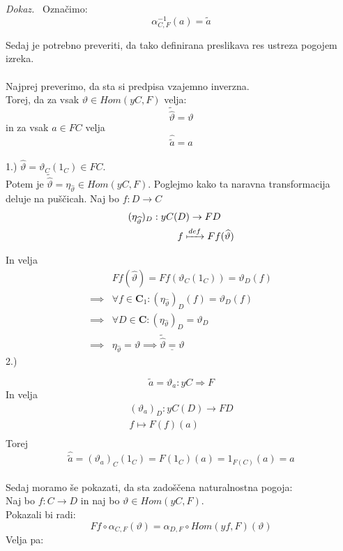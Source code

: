 \documentclass[12pt,a4paper]{book}
\theoremstyle{definition}
\theoremstyle{plain}
\newenvironment{dokaz}{\emph{Dokaz.}\ }{\hspace{\fill}{$\Box$}}
\theoremstyle{definition}
\theoremstyle{remark}
\begin{document}
\begin{dokaz}
Označimo:
\begin{equation}
\boxed{\alpha^{-1}_{C,F}(a) = \widetilde{a}}
\end{equation}

Sedaj je potrebno preveriti, da tako definirana preslikava res ustreza pogojem izreka. \\
\\
Najprej preverimo, da sta si predpisa vzajemno inverzna. \\
Torej, da za vsak $\vartheta \in Hom(yC,F)$ velja: 
$$\widetilde{\widehat{\vartheta}} = \vartheta$$
in za vsak $a \in FC$ velja
$$\widehat{\widetilde{a}} = a$$
\\ 1.)
$\widehat{\vartheta} = \vartheta_C(1_C) \in FC$. \\
Potem je $\widetilde{\widehat{\vartheta}} = \eta_{\widehat{\vartheta}} \in Hom(yC,F)$. Poglejmo kako ta naravna transformacija deluje na puščicah. Naj bo $f : D \to C$
\begin{align*}
(\eta_{\widehat{\vartheta}})_D : yC(&D) \to FD \\
&f \xmapsto{def} Ff(\widehat{\vartheta}) \\
\end{align*}

In velja
\begin{align*}
&Ff(\widehat{\vartheta}) = Ff(\vartheta_C(1_C)) = \vartheta_D(f) \\
\implies& \forall f \in \textbf{C}_1  : (\eta_{\widehat{\vartheta}})_D(f) = \vartheta_D(f) \\
\implies& \forall D \in \textbf{C} : (\eta_{\widehat{\vartheta}})_D = \vartheta_D \\
\implies& \eta_{\widehat{\vartheta}} = \vartheta
\implies \underline{\widetilde{\widehat{\vartheta}} = \vartheta}
\end{align*}
2.) 

$$\widetilde{a} = \vartheta_a : yC \Rightarrow F$$
In velja
\begin{align*}
(\vartheta_a)_D : yC(D) \to FD \\
f \mapsto F(f)(a) \\
\end{align*}
Torej
$$\widehat{\widetilde{a}} = (\vartheta_a)_C(1_C) = F(1_C)(a) = 1_{F(C)}(a) = a$$
\\
Sedaj moramo še pokazati, da sta zadoščena naturalnostna pogoja: \\
Naj bo $f : C \to D$ in naj bo $\vartheta \in Hom(yC,F)$. \\
Pokazali bi radi:
\begin{equation}
Ff \circ \alpha_{C,F}(\vartheta) = \alpha_{D,F} \circ Hom(yf,F)(\vartheta)
\end{equation}
Velja pa:


\end{dokaz}
\end{document}
